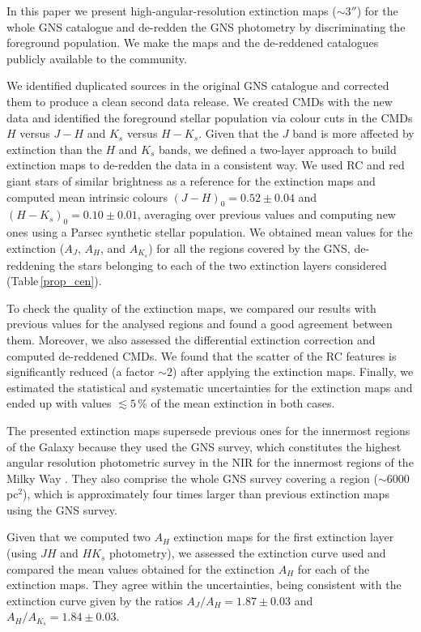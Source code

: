\documentclass{aa}
\begin{document}
In this paper we present high-angular-resolution extinction maps ($\sim3''$) for the whole GNS catalogue and de-redden the GNS photometry by discriminating the foreground population. We make the maps and the de-reddened catalogues publicly available to the community. 

We identified duplicated sources in the original GNS catalogue and corrected them to produce a clean second data release. We created CMDs with the new data and identified the foreground stellar population via colour cuts in the CMDs $H$ versus $J-H$ and $K_s$ versus $H-K_s$. Given that the $J$ band is more affected by extinction than the $H$ and $K_s$ bands, we defined a two-layer approach to build extinction maps to de-redden the data in a consistent way. We used RC and red giant stars of similar brightness as a reference for the extinction maps and computed mean intrinsic colours $(J-H)_0=0.52\pm0.04$ and $(H-K_s)_0=0.10\pm0.01$, averaging over previous values and computing new ones using a Parsec synthetic stellar population. We obtained mean values for the extinction ($A_J$, $A_H$, and $A_{K_s}$) for all the regions covered by the GNS, de-reddening the stars belonging to each of the two extinction layers considered (Table\,\ref{prop_cen}). 

To check the quality of the extinction maps, we compared our results with previous values for the analysed regions and found a good agreement between them. Moreover, we also assessed the differential extinction correction and computed de-reddened CMDs. We found that the scatter of the RC features is  significantly reduced (a factor $\sim 2$) after applying the extinction maps. Finally, we estimated the statistical and systematic uncertainties for the extinction maps and ended up with values $\lesssim 5$\,\% of the mean extinction in both cases. 

The presented extinction maps supersede previous ones for the innermost regions of the Galaxy because they used the GNS survey, which constitutes the highest angular resolution photometric survey in the NIR for the innermost regions of the Milky Way \citep{Nogueras-Lara:2019aa}. They also comprise the whole GNS survey covering a region ($\sim 6000$\,pc$^2$), which is approximately four times larger than previous extinction maps using the GNS survey.  

Given that we computed two $A_H$ extinction maps for the first extinction layer (using $JH$ and $HK_s$ photometry), we assessed the  extinction curve used \citep{Nogueras-Lara:2019ac, Nogueras-Lara:2020aa} and compared the mean values obtained for the extinction $A_H$ for each of the extinction maps. They agree within the uncertainties, being consistent with the extinction curve given by the ratios $A_J/A_H = 1.87\pm0.03$ and $A_H/A_{K_s}= 1.84\pm0.03$.
\end{document}
